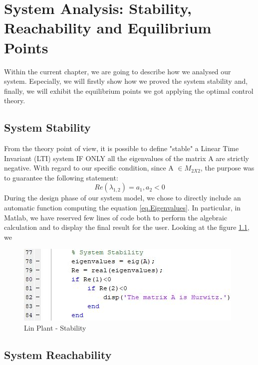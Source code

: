\chapter{System Analysis: Stability, Reachability and Equilibrium Points}
	Within the current chapter, we are going to describe how we analysed our system. Especially, we will firstly show how we proved the system stability and, finally, we will exhibit the equilibrium points we got applying the optimal control theory.
	\section{System Stability} 
	From the theory point of view, it is possible to define "stable" a Linear Time Invariant (LTI) system IF ONLY all the eigenvalues of the matrix A are strictly negative. With regard to our specific condition, since A $\in M_{2X2}$, the purpose was to guarantee the following statement:\\
	\begin{equation} \label{eq.Eigenvalues}
	Re(\lambda_{1,2})=a_{1},a_{2} < 0
	\end{equation}
	During the design phase of our system model, we chose to directly include an automatic function computing the equation \ref{eq.Eigenvalues}. In particular, in Matlab, we have reserved few lines of code both to perform the algebraic calculation and to display the final result for the user. Looking at the figure \ref{stability}, we
	\begin{figure}
		\centering
		\includegraphics[scale=1]{Images/Stability}
		\caption{Lin Plant - Stability}
		\label{stability}
	\end{figure}
	\section{System Reachability}
